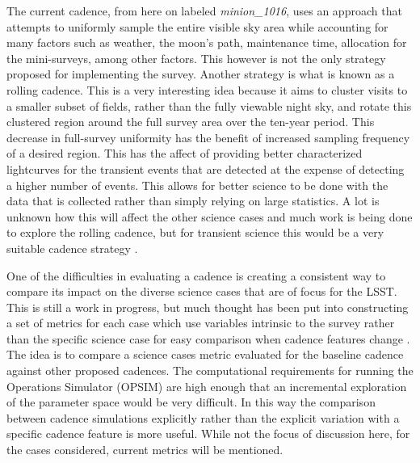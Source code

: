 \documentclass[12pt]{article}
\begin{document}
The current cadence, from here on labeled \textit{minion\_1016}, uses an approach that attempts to uniformly sample the entire visible sky area while accounting for many factors such as weather, the moon's path, maintenance time, allocation for the mini-surveys, among other factors. This however is not the only strategy proposed for implementing the survey. Another strategy is what is known as a rolling cadence. This is a very interesting idea because it aims to cluster visits to a smaller subset of fields, rather than the fully viewable night sky, and rotate this clustered region around the full survey area over the ten-year period. This decrease in full-survey uniformity has the benefit of increased sampling frequency of a desired region. This has the affect of providing better characterized lightcurves for the transient events that are detected at the expense of detecting a higher number of events. This allows for better science to be done with the data that is collected rather than simply relying on large statistics. A lot is unknown how this will affect the other science cases and much work is being done to explore the rolling cadence, but for transient science this would be a very suitable cadence strategy \citep{LSSTScienceCollaboration2017}. \par
One of the difficulties in evaluating a cadence is creating a consistent way to compare its impact on the diverse science cases that are of focus for the LSST. This is still a work in progress, but much thought has been put into constructing a set of metrics for each case which use variables intrinsic to the survey rather than the specific science case for easy comparison when cadence features change \citep{LSSTScienceCollaboration2017}. The idea is to compare a science cases metric evaluated for the baseline cadence against other proposed cadences. The computational requirements for running the Operations Simulator (OPSIM) are high enough that an incremental exploration of the parameter space would be very difficult. In this way the comparison between cadence simulations explicitly rather than the explicit variation with a specific cadence feature is more useful. While not the focus of discussion here, for the cases considered, current metrics will be mentioned. \par
\end{document}
